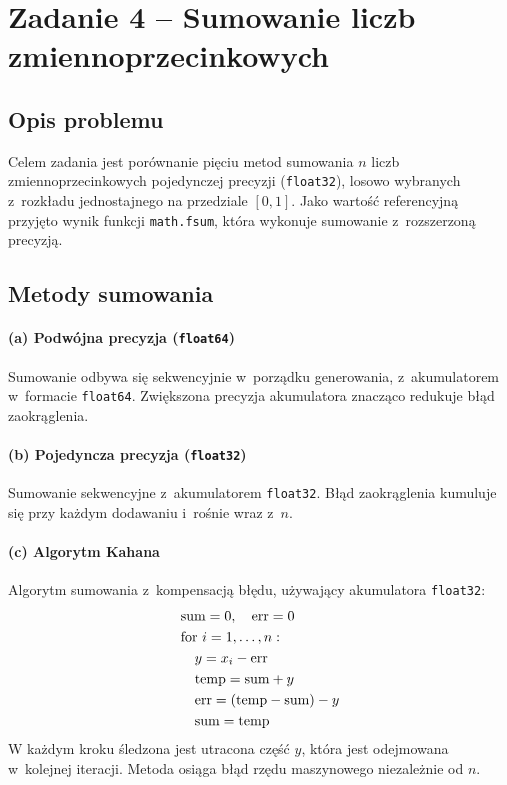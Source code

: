 \documentclass[12pt, a4paper]{article}
\begin{document}
\section{Zadanie 4 -- Sumowanie liczb zmiennoprzecinkowych}

\subsection{Opis problemu}

Celem zadania jest porównanie pięciu metod sumowania $n$ liczb zmiennoprzecinkowych pojedynczej precyzji (\texttt{float32}), losowo wybranych z~rozkładu jednostajnego na przedziale $[0, 1]$. Jako wartość referencyjną przyjęto wynik funkcji \texttt{math.fsum}, która wykonuje sumowanie z~rozszerzoną precyzją.

\subsection{Metody sumowania}

\paragraph{(a) Podwójna precyzja (\texttt{float64})}

Sumowanie odbywa się sekwencyjnie w~porządku generowania, z~akumulatorem w~formacie \texttt{float64}. Zwiększona precyzja akumulatora znacząco redukuje błąd zaokrąglenia.

\paragraph{(b) Pojedyncza precyzja (\texttt{float32})}

Sumowanie sekwencyjne z~akumulatorem \texttt{float32}. Błąd zaokrąglenia kumuluje się przy każdym dodawaniu i~rośnie wraz z~$n$.

\paragraph{(c) Algorytm Kahana}

Algorytm sumowania z~kompensacją błędu, używający akumulatora \texttt{float32}:
\begin{align}
  &\text{sum} = 0, \quad \text{err} = 0 \notag \\
  &\text{for } i = 1, \ldots, n: \notag \\
  &\quad y = x_i - \text{err} \notag \\
  &\quad \text{temp} = \text{sum} + y \notag \\
  &\quad \text{err} = (\text{temp} - \text{sum}) - y \notag \\
  &\quad \text{sum} = \text{temp}
\end{align}
W każdym kroku śledzona jest utracona część $y$, która jest odejmowana w~kolejnej iteracji. Metoda osiąga błąd rzędu maszynowego niezależnie od $n$.
\end{document}
